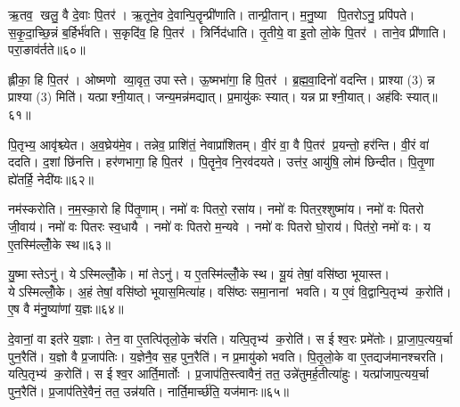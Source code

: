 ऋ॒तव॒ खलु॒ वै दे॒वाः पि॒तर॑। ऋ॒तूने॒व दे॒वान्पि॒तॄन्प्री॑णाति। तान्प्री॒तान्। म॒नु॒ष्या पि॒तरोऽनु॒ प्रपि॑पते। स॒कृ॒दा॒च्छि॒न्नं ब॒र्\mbox{}हिर्भ॑वति। स॒कृदि॑व॒ हि पि॒तर॑। त्रिर्निद॑धाति। तृ॒तीये॒ वा इ॒तो लो॒के पि॒तर॑। ताने॒व प्री॑णाति। परा॒ङाव॑र्तते॥६०॥

ह्लीका॒ हि पि॒तर॑। ओष्मणो व्या॒वृत॒ उपास्ते। ऊ॒ष्मभा॑गा॒ हि पि॒तर॑। ब्र॒ह्म॒वा॒दिनो॑ वदन्ति। प्राश्या (3) न्न प्राश्या (3) मिति॑। यत्प्राश्नी॒यात्। जन्य॒मन्न॑मद्यात्। प्र॒मायु॑कः स्यात्। यन्न प्राश्नी॒यात्। अह॑विः स्यात्॥६१॥

पि॒तृभ्य॒ आवृ॑श्च्येत। अ॒व॒घ्रेय॑मे॒व। तन्नेव॒ प्राशि॑तं॒ नेवाप्रा॑शितम्। वी॒रं वा॒ वै पि॒तर॑ प्र॒यन्तो॒ हर॑न्ति। वी॒रं वा॑ ददति। द॒शां छि॑नत्ति। हर॑णभागा॒ हि पि॒तर॑। पि॒तॄने॒व नि॒रव॑दयते। उत्त॑र॒ आयु॑षि॒ लोम॑ छिन्दीत। पि॒तृ॒णा ह्ये॑तर्\mbox{}हि॒ नेदी॑यः॥६२॥

नम॑स्करोति। न॒म॒स्का॒रो हि पि॑तृ॒णाम्। नमो॑ वः पितरो॒ रसा॑य। नमो॑ वः पितर॒श्शुष्मा॑य। नमो॑ वः पितरो जी॒वाय॑। नमो॑ वः पितरः स्व॒धायै। नमो॑ वः पितरो म॒न्यवे। नमो॑ वः पितरो घो॒राय॑। पित॑रो॒ नमो॑ वः। य ए॒तस्मि॑ल्लोँ॒के स्थ॥६३॥

यु॒ष्मास्तेऽनु॑। येऽस्मिल्लोँ॒के। मां तेऽनु॑। य ए॒तस्मि॑ल्लोँ॒के स्थ। यू॒यं तेषां॒ वसि॑ष्ठा भूयास्त। येऽस्मिल्लोँ॒के। अ॒हं तेषां॒ वसि॑ष्ठो भूयास॒मित्या॑ह। वसि॑ष्ठः समा॒नानां भवति। य ए॒वं वि॒द्वान्पि॒तृभ्य॑ क॒रोति॑। ए॒ष वै म॑नु॒ष्या॑णां य॒ज्ञः॥६४॥

दे॒वानां॒ वा इत॑रे य॒ज्ञाः। तेन॒ वा ए॒तत्पि॑तृलो॒के च॑रति। यत्पि॒तृभ्य॑ क॒रोति॑। स ईश्व॒रः प्रमे॑तोः। प्रा॒जा॒प॒त्यय॒र्चा पुन॒रैति॑। य॒ज्ञो वै प्र॒जाप॑तिः। य॒ज्ञेनै॒व स॒ह पुन॒रैति॑। न प्र॒मायु॑को भवति। पि॒तृ॒लो॒के वा ए॒तद्यज॑मानश्चरति। यत्पि॒तृभ्य॑ क॒रोति॑। स ईश्व॒र आर्ति॒मार्तोः। प्र॒जाप॑ति॒स्त्वावैनं॒ तत॒ उन्ने॑तुमर्\mbox{}ह॒तीत्या॑हुः। यत्प्रा॑जाप॒त्यय॒र्चा पुन॒रैति॑। प्र॒जाप॑तिरे॒वैनं॒ तत॒ उन्न॑यति। नार्ति॒मार्च्छ॑ति॒ यज॑मानः॥६५॥



